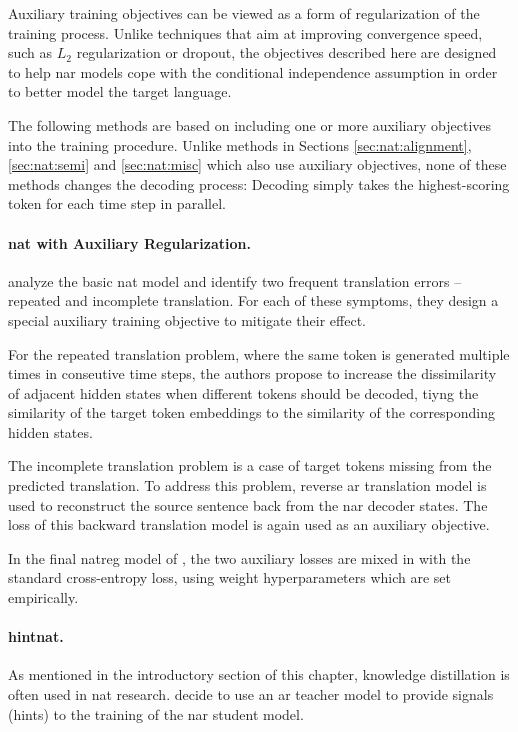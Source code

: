 Auxiliary training objectives can be viewed as a form of regularization of the
training process. Unlike techniques that aim at improving convergence speed,
such as $L_2$ regularization or dropout, the objectives described here are
designed to help \acl{nar} models cope with the conditional independence
assumption in order to better model the target language.

The following methods are based on including one or more auxiliary objectives
into the training procedure. Unlike methods in Sections
\ref{sec:nat:alignment}, \ref{sec:nat:semi} and \ref{sec:nat:misc} which also
use auxiliary objectives, none of these methods changes the decoding process:
Decoding simply takes the highest-scoring token for each time step in parallel.

\paragraph{\Ac{nat} with Auxiliary Regularization.}
\citet{wang-etal-2019-nonautoregressive} analyze the basic \ac{nat} model
\citep{gu2017nonautoregressive} and identify two frequent translation errors --
repeated and incomplete translation. For each of these symptoms, they design a
special auxiliary training objective to mitigate their effect.

For the repeated translation problem, where the same token is generated
multiple times in conseutive time steps, the authors propose to increase the
dissimilarity of adjacent hidden states when different tokens should be
decoded, tiyng the similarity of the target token embeddings to the similarity
of the corresponding hidden states.

The incomplete translation problem is a case of target tokens missing from the
predicted translation. To address this problem, reverse \ac{ar} translation
model is used to reconstruct the source sentence back from the \ac{nar} decoder
states. The loss of this backward translation model is again used as an
auxiliary objective.

In the final \acs{natreg} model of \citet{wang-etal-2019-nonautoregressive},
the two auxiliary losses are mixed in with the standard cross-entropy loss,
using weight hyperparameters which are set empirically.

\paragraph{\Acs{hintnat}.} As mentioned in the introductory section of this
chapter, knowledge distillation is often used in \ac{nat}
research. \citet{li-etal-2019-hint} decide to use an \ac{ar} teacher model to
provide signals (hints) to the training of the \ac{nar} student model.

